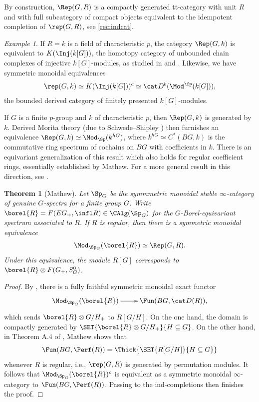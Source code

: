 \documentclass{amsart}%
\numberwithin{equation}{section}%
\newtheorem{Thm}[equation]{Theorem}
\theoremstyle{remark}
\newtheorem{Exa}[equation]{Example}
\begin{document}
By construction, $\Rep(G,R)$ is a compactly generated tt-category with unit $R$ and with full subcategory of compact objects equivalent to the idempotent completion of $\rep(G,R)$, see \cref{rec:indcat}. 

\begin{Exa}
If $R =k$ is a field of characteristic $p$, the category $\Rep(G,k)$ is equivalent to $K(\Inj(k[G]))$, the homotopy category of unbounded chain complexes of injective $k[G]$-modules, as studied in \cite{bensonkrause_kinj} and \cite{BensonIyengarKrause11a}. Likewise, we have symmetric monoidal equivalences
\[
\rep(G,k) \simeq K(\Inj(k[G]))^c \simeq \cat D^b(\Mod^{\fp}(k[G])),
\]
the bounded derived category of finitely presented $k[G]$-modules.
\end{Exa}

If $G$ is a finite $p$-group and $k$ of characteristic $p$, then $\Rep(G,k)$ is generated by $k$. Derived Morita theory (due to Schwede--Shipley \cite{SS03}) then furnishes an equivalence $\Rep(G,k) \simeq \Mod_{\Sp}(k^{hG})$, where $k^{hG} \simeq C^*(BG,k)$ is the commutative ring spectrum of cochains on $BG$ with coefficients in $k$. There is an equivariant generalization of this result which also holds for regular coefficient rings, essentially established by Mathew. For a more general result in this direction, see \cite{balmergallauer_permutationmodulescohomsing}.

\begin{Thm}[Mathew]\label{thm:eqmoritarep}
Let $\Sp_G$ be the symmmetric monoidal stable $\infty$-category of genuine $G$-spectra for a finite group $G$. Write $\borel{R} = F(EG_+,\infl R) \in \CAlg(\Sp_G)$ for the $G$-Borel-equivariant spectrum associated to $R$. If $R$ is regular, then there is a symmetric monoidal equivalence
\[
\Mod_{\Sp_G}(\borel{R}) \simeq \Rep(G,R).
\]
Under this equivalence, the module $R[G]$ corresponds to $\borel{R}\otimes F(G_+,S_G^0)$.
\end{Thm}
\begin{proof}
By \cite[Cor.~6.21]{MathewNaumannNoel17}, there is a fully faithful symmetric monoidal exact functor
\[
\xymatrix{\Mod_{\Sp_G}(\borel{R}) \ar[r] & \Fun(BG,\cat D(R)),}
\]
which sends $\borel{R} \otimes G/H_+$ to $R[G/H]$. On the one hand, the domain is compactly generated by $\SET{\borel{R} \otimes G/H_+}{H\subseteq G}$. On the other hand, in Theorem A.4 of \cite{treumannmathew_reps}, Mathew shows that 
\begin{equation}\label{eq:permmodulesgenerate}
\Fun(BG,\Perf(R)) = \Thick{\SET{R[G/H]}{H\subseteq G}}
\end{equation}
whenever $R$ is regular, i.e., $\rep(G,R)$ is generated by  permutation modules. It follows that $\Mod_{\Sp_G}(\borel{R})^c$ is equivalent as a symmetric monoidal $\infty$-category to $\Fun(BG,\Perf(R))$. Passing to the ind-completions then finishes the proof.
\end{proof}
\end{document}
